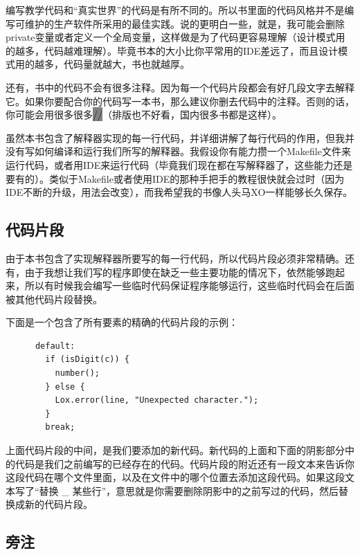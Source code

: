 \documentclass[cn,10pt,math=newtx,citestyle=gb7714-2015,bibstyle=gb7714-2015]{elegantbook}
\newenvironment{code}{\captionsetup{type=listing}}{}
\begin{document}
编写教学代码和“真实世界”的代码是有所不同的。所以书里面的代码风格并不是编写可维护的生产软件所采用的最佳实践。说的更明白一些，就是，我可能会删除private变量或者定义一个全局变量，这样做是为了代码更容易理解（设计模式用的越多，代码越难理解）。毕竟书本的大小比你平常用的IDE差远了，而且设计模式用的越多，代码量就越大，书也就越厚。

还有，书中的代码不会有很多注释。因为每一个代码片段都会有好几段文字去解释它。如果你要配合你的代码写一本书，那么建议你删去代码中的注释。否则的话，你可能会用很多很多\colorbox{gray}{//}（排版也不好看，国内很多书都是这样）。

虽然本书包含了解释器实现的每一行代码，并详细讲解了每行代码的作用，但我并没有写如何编译和运行我们所写的解释器。我假设你有能力攒一个Makefile文件来运行代码，或者用IDE来运行代码（毕竟我们现在都在写解释器了，这些能力还是要有的）。类似于Makefile或者使用IDE的那种手把手的教程很快就会过时（因为IDE不断的升级，用法会改变），而我希望我的书像人头马XO一样能够长久保存。

\subsection{代码片段}

由于本书包含了实现解释器所要写的每一行代码，所以代码片段必须非常精确。还有，由于我想让我们写的程序即使在缺乏一些主要功能的情况下，依然能够跑起来，所以有时候我会编写一些临时代码保证程序能够运行，这些临时代码会在后面被其他代码片段替换。

下面是一个包含了所有要素的精确的代码片段的示例：

\begin{code}
\begin{verbatim}
      default:
        if (isDigit(c)) {
          number();
        } else {
          Lox.error(line, "Unexpected character.");
        }
        break;
\end{verbatim}
\end{code}

上面代码片段的中间，是我们要添加的新代码。新代码的上面和下面的阴影部分中的代码是我们之前编写的已经存在的代码。代码片段的附近还有一段文本来告诉你这段代码在哪个文件里面，以及在文件中的哪个位置去添加这段代码。如果这段文本写了“替换 \_ 某些行”，意思就是你需要删除阴影中的之前写过的代码，然后替换成新的代码片段。

\subsection{旁注}
\end{document}
